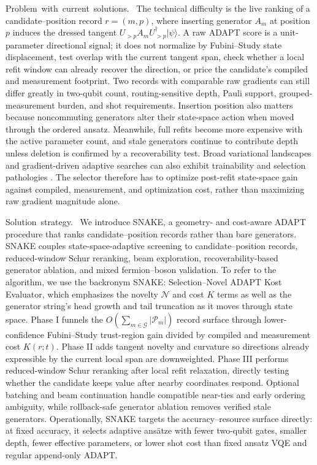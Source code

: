 \documentclass[
  reprint,
  amsmath,
  amssymb,
  aps,
  pra,
  nofootinbib,
  superscriptaddress,
  floatfix
]{revtex4-2}
\newcommand{\tentative}[1]{\textcolor{red!70!black}{#1}}
\newcommand{\structlabel}[1]{\noindent\mbox{\tentative{#1.}}~}
\newcommand{\Gset}{\mathcal{G}}
\newcommand{\Pcal}{\mathcal{P}}
\newcommand{\ket}[1]{|#1\rangle}
\begin{document}
\structlabel{Problem with current solutions}
The technical difficulty is the live ranking of a candidate--position record $r=(m,p)$, where inserting generator $A_m$ at position $p$ induces the dressed tangent $U_{>p}A_mU_{>p}^{\dagger}\ket{\psi}$.  A raw ADAPT score is a unit-parameter directional signal; it does not normalize by Fubini--Study state displacement, test overlap with the current tangent span, check whether a local refit window can already recover the direction, or price the candidate's compiled and measurement footprint.  Two records with comparable raw gradients can still differ greatly in two-qubit count, routing-sensitive depth, Pauli support, grouped-measurement burden, and shot requirements.  Insertion position also matters because noncommuting generators alter their state-space action when moved through the ordered ansatz.  Meanwhile, full refits become more expensive with the active parameter count, and stale generators continue to contribute depth unless deletion is confirmed by a recoverability test.  Broad variational landscapes and gradient-driven adaptive searches can also exhibit trainability and selection pathologies \cite{McClean2018BarrenPlateaus,Stadelmann2025GradientTroughs}.  The selector therefore has to optimize post-refit state-space gain against compiled, measurement, and optimization cost, rather than maximizing raw gradient magnitude alone.

\structlabel{Solution strategy}
We introduce SNAKE, a geometry- and cost-aware ADAPT procedure that ranks candidate--position records rather than bare generators.  SNAKE couples state-space-adaptive screening to candidate--position records, reduced-window Schur reranking, beam exploration, recoverability-based generator ablation, and mixed fermion--boson validation.  To refer to the algorithm, we use the backronym SNAKE: Selection--Novel ADAPT Kost Evaluator, which emphasizes the novelty $\mathcal N$ and cost $K$ terms as well as the generator string's head growth and tail truncation as it moves through state space.  Phase I funnels the $O(\sum_{m\in\Gset}|\Pcal_m|)$ record surface through lower-confidence Fubini--Study trust-region gain divided by compiled and measurement cost $K(r;t)$.  Phase II adds tangent novelty and curvature so directions already expressible by the current local span are downweighted.  Phase III performs reduced-window Schur reranking after local refit relaxation, directly testing whether the candidate keeps value after nearby coordinates respond.  Optional batching and beam continuation handle compatible near-ties and early ordering ambiguity, while rollback-safe generator ablation removes verified stale generators.  Operationally, SNAKE targets the accuracy--resource surface directly: at fixed accuracy, it selects adaptive ansätze with fewer two-qubit gates, smaller depth, fewer effective parameters, or lower shot cost than fixed ansatz VQE and regular append-only ADAPT.
\end{document}
